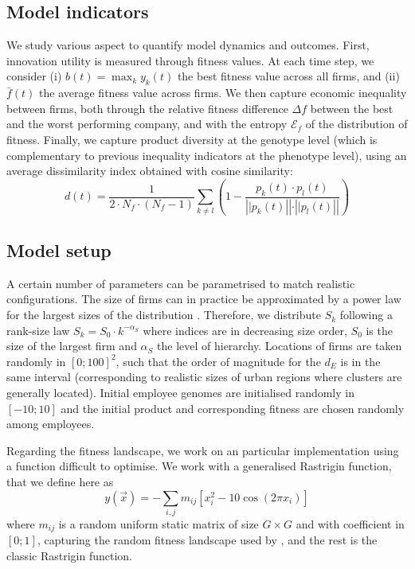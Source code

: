 \documentclass[letterpaper]{article}
\begin{document}
\subsection{Model indicators}

We study various aspect to quantify model dynamics and outcomes. First, innovation utility is measured through fitness values. At each time step, we consider (i) $b(t) = \max_k y_k (t)$ the best fitness value across all firms, and (ii) $\bar{f} (t)$ the average fitness value across firms. We then capture economic inequality between firms, both through the relative fitness difference $\Delta f$ between the best and the worst performing company, and with the entropy $\mathcal{E}_f$ of the distribution of fitness. Finally, we capture product diversity at the genotype level (which is complementary to previous inequality indicators at the phenotype level), using an average dissimilarity index obtained with cosine similarity:
\[
d(t) = \frac{1}{2 \cdot N_f \cdot (N_f - 1)} \sum_{k \neq l} \left(1 - \frac{p_k (t)\cdot p_l (t)}{\left||p_k (t)\right|| \cdot \left||p_l (t)\right||}\right)
\]


\subsection{Model setup}

A certain number of parameters can be parametrised to match realistic configurations. The size of firms can in practice be approximated by a power law for the largest sizes of the distribution \citep{growiec2008size}. Therefore, we distribute $S_k$ following a rank-size law $S_k = S_0 \cdot k^{-\alpha_S}$ where indices are in decreasing size order, $S_0$ is the size of the largest firm and $\alpha_S$ the level of hierarchy. Locations of firms are taken randomly in $\left[0 ; 100 \right]^2$, such that the order of magnitude for the $d_E$ is in the same interval (corresponding to realistic sizes of urban regions where clusters are generally located). Initial employee genomes are initialised randomly in $[-10 ; 10]$ and the initial product and corresponding fitness are chosen randomly among employees.

Regarding the fitness landscape, we work on an particular implementation using a function difficult to optimise. We work with a generalised Rastrigin function, that we define here as
\[
y(\vec{x}) = - \sum_{i,j} m_{ij} \left[x_i^2 - 10 \cos\left(2 \pi x_i\right) \right]
\]
where $m_{ij}$ is a random uniform static matrix of size $G \times G$ and with coefficient in $[0;1]$, capturing the random fitness landscape used by  \cite{ma2005agent}, and the rest is the classic Rastrigin function.
\end{document}
